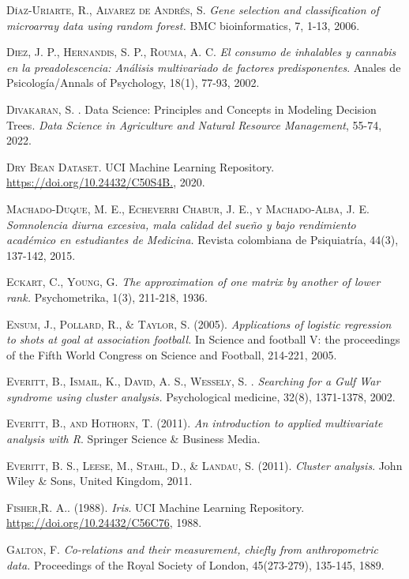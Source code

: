 \begin{thebibliography}{99}
\textsc{Díaz-Uriarte, R., Alvarez de Andrés, S. }\emph{ Gene selection and classification of microarray data using random forest.} BMC bioinformatics, 7, 1-13, 2006.

\textsc{Diez, J. P., Hernandis, S. P., Rouma, A. C. } \emph{El consumo de inhalables y cannabis en la preadolescencia: Análisis multivariado de factores predisponentes}. Anales de Psicología/Annals of Psychology, 18(1), 77-93, 2002.

\textsc{Divakaran, S. . }Data Science: Principles and Concepts in Modeling Decision Trees.\emph{ Data Science in Agriculture and Natural Resource Management}, 55-74, 2022.

 \textsc{Dry Bean Dataset}. UCI Machine Learning Repository.  \url{https://doi.org/10.24432/C50S4B.}, 2020.

 \textsc{Machado-Duque, M. E., Echeverri Chabur, J. E., y Machado-Alba, J. E. } \emph{Somnolencia diurna excesiva, mala calidad del sueño y bajo rendimiento académico en estudiantes de Medicina.} Revista colombiana de Psiquiatría, 44(3), 137-142, 2015.


\textsc{Eckart, C., Young, G. } \emph{The approximation of one matrix by another of lower rank.} Psychometrika, 1(3), 211-218, 1936.

\textsc{Ensum, J., Pollard, R., \& Taylor, S. (2005).}\emph{ Applications of logistic regression to shots at goal at association football.} In Science and football V: the proceedings of the Fifth World Congress on Science and Football, 214-221, 2005.

 \textsc{Everitt, B., Ismail, K., David, A. S., Wessely, S. }. \emph{Searching for a Gulf War syndrome using cluster analysis.} Psychological medicine, 32(8), 1371-1378, 2002.

\textsc{Everitt, B., and Hothorn, T. (2011)}. \emph{An introduction to applied multivariate analysis with R}. Springer Science \& Business Media.

\textsc{Everitt, B. S., Leese, M., Stahl, D., \& Landau, S. (2011}). \emph{Cluster analysis}. John Wiley \& Sons, United Kingdom, 2011. 

 \textsc{Fisher,R. A.. (1988).} \emph{Iris}. UCI Machine Learning Repository. \url{https://doi.org/10.24432/C56C76}, 1988.

 \textsc{Galton, F. } \emph{Co-relations and their measurement, chiefly from anthropometric data.} Proceedings of the Royal Society of London, 45(273-279), 135-145, 1889.


\end{thebibliography}
